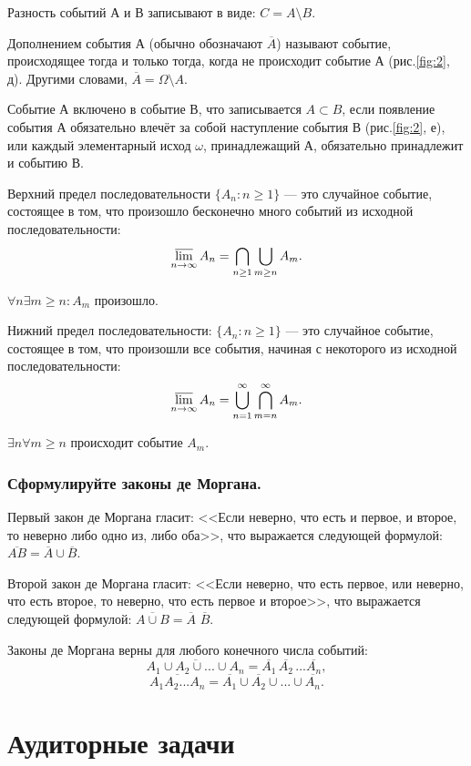 \documentclass{book}
\begin{document}
Разность событий А и В записывают в виде: $C=A\setminus B$.

Дополнением события А (обычно обозначают $\overline{A}$) называют событие, происходящее тогда и только тогда, когда не происходит событие А (рис.\ref{fig:2}, д). Другими словами, $\overline{A}=\Omega\setminus A$.

Событие А включено в событие В, что записывается $A\subset B$, если появление события А обязательно влечёт за собой наступление события В (рис.\ref{fig:2}, е), или каждый элементарный исход $\omega$, принадлежащий А, обязательно принадлежит и событию В.

Верхний предел последовательности $\{A_n: n\geq 1\}$ --- это случайное событие, состоящее в том, что произошло бесконечно много событий из исходной последовательности: $$\varlimsup\limits_{n\to\infty}A_n=\bigcap\limits_{n\geq 1}\bigcup\limits_{m\geq n}A_m.$$

$\forall n \exists m\geq n: A_m$ произошло.

Нижний предел последовательности: $\{A_n: n\geq 1\}$ --- это случайное событие, состоящее в том, что произошли все события, начиная с некоторого из исходной последовательности: $$\varlimsup\limits_{n\to\infty}A_n=\bigcup\limits_{n=1}^\infty\bigcap\limits_{m=n}^\infty A_m.$$

$\exists n \forall m\geq n$ происходит событие $A_m$.

\subsubsection*{Сформулируйте законы де Моргана.}

Первый закон де Моргана гласит: <<Если неверно, что есть и первое, и второе, то неверно либо одно из, либо оба>>, что выражается следующей формулой: $\overline{AB}=\overline{A}\cup\overline{B}$.

Второй закон де Моргана гласит: <<Если неверно, что есть первое, или неверно, что есть второе, то неверно, что есть первое и второе>>, что выражается следующей формулой: $\overline{A\cup B}=\overline{A}$ $\overline{B}$.

Законы де Моргана верны для любого конечного числа событий: $$\overline{A_1\cup A_2\cup...\cup A_n}=\overline{A_1}\,\overline{A_2}\,...\overline{A_n},$$ $$\overline{A_1A_2...A_n}=\overline{A_1}\cup\overline{A_2}\cup...\cup\overline{A_n}.$$

\section*{Аудиторные задачи}
\end{document}
